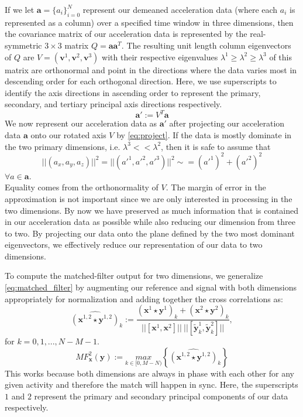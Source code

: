 \documentclass[journal]{IEEEtran}
\begin{document}
If we let $\textbf{a} = \{a_i\}_{i=0}^{N}$ represent our demeaned acceleration data (where each $a_i$ is represented as a column) over a specified time window in three dimensions, then the covariance matrix of our acceleration data is represented by the real-symmetric $3 \times 3$ matrix $Q = \textbf{a} \textbf{a}^T$.
The resulting unit length column eigenvectors of $Q$ are $V = (\textbf{v}^1,\textbf{v}^2,\textbf{v}^3)$ with their respective eigenvalues $\lambda^1 \geq \lambda^2 \geq \lambda^3$ of this matrix are orthonormal and point in the directions where the data varies most in descending order for each orthogonal direction. Here, we use superscripts to identify the axis directions in ascending order to represent the primary, secondary, and tertiary principal axis directions respectively.
\begin{equation} \label{eq:project}
   \textbf{a}' := V^T \textbf{a}
\end{equation}
%
We now represent our acceleration data as $\textbf{a}'$ after projecting our acceleration data $\textbf{a}$ onto our rotated axis $V$ by \eqref{eq:project}. If the data is mostly dominate in the two primary dimensions, i.e. $\lambda^3 << \lambda^2$, then it is safe to assume that
%
\begin{equation} \label{eq:magnitude}
||(a_x,a_y,a_z)||^2 = ||(a'^1,a'^2,a'^3)||^2 \sim = (a'^1)^2 + (a'^2)^2
\end{equation}
$ \forall a \in \textbf{a}. $ \\
%
Equality comes from the orthonormality of $V$. The margin of error in the approximation is not important since we are only interested in processing in the two dimensions.
By now we have preserved as much information that is contained in our acceleration data as possible while also reducing our dimension from three to two.
By projecting our data onto the plane defined by the two most dominant eigenvectors, we effectively reduce our representation of our data to two dimensions.

To compute the matched-filter output for two dimensions, we generalize \eqref{eq:matched_filter} by augmenting our reference and signal with both dimensions appropriately for normalization and adding together the cross correlations as:
%
\begin{equation} \label{eq:cross_correlation_2}
\widehat{(\textbf{x}^{1,2} \star \textbf{y}^{1,2})}_k := \frac{(\textbf{x}^1 \star \textbf{y}^1)_k + (\textbf{x}^2 \star \textbf{y}^2)_k}{||[ \textbf{x}^1, \textbf{x}^2 ]|| \ || [ \widetilde{\textbf{y}}_k^1, \widetilde{\textbf{y}}_k^2 ] || },
\end{equation}
%
for $ k = 0,1,...,N-M-1 $. \\
%
\begin{equation} \label{eq:matched_filter_2}
MF_{\textbf{x}}^2(\textbf{y}) := \underset{k \in [0, M-N)}{max} \left \{\widehat{(\textbf{x}^{1,2} \star \textbf{y}^{1,2})}_k \right \}
\end{equation}
%
This works because both dimensions are always in phase with each other for any given activity and therefore the match will happen in sync. Here, the superscripts $1$ and $2$ represent the primary and secondary principal components of our data respectively.
%
\end{document}
